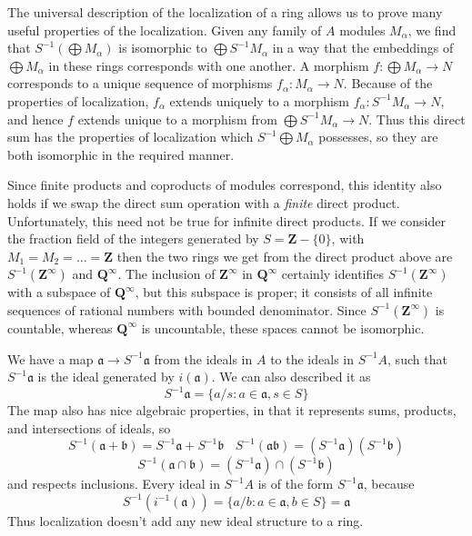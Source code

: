 The universal description of the localization of a ring allows us to prove many useful properties of the localization. Given any family of $A$ modules $M_\alpha$, we find that $S^{-1}(\bigoplus M_\alpha)$ is isomorphic to $\bigoplus S^{-1} M_\alpha$ in a way that the embeddings of $\bigoplus M_\alpha$ in these rings corresponds with one another. A morphism $f: \bigoplus M_\alpha \to N$ corresponds to a unique sequence of morphisms $f_\alpha: M_\alpha \to N$. Because of the properties of localization, $f_\alpha$ extends uniquely to a morphism $f_\alpha: S^{-1} M_\alpha \to N$, and hence $f$ extends unique to a morphism from $\bigoplus S^{-1} M_\alpha \to N$. Thus this direct sum has the properties of localization which $S^{-1} \bigoplus M_\alpha$ possesses, so they are both isomorphic in the required manner.

\begin{remark}
    Since finite products and coproducts of modules correspond, this identity also holds if we swap the direct sum operation with a {\it finite} direct product. Unfortunately, this need not be true for infinite direct products. If we consider the fraction field of the integers generated by $S = \mathbf{Z} - \{ 0 \}$, with $M_1 = M_2 = \dots = \mathbf{Z}$ then the two rings we get from the direct product above are $S^{-1}(\mathbf{Z}^\infty)$ and $\mathbf{Q}^\infty$. The inclusion of $\mathbf{Z}^\infty$ in $\mathbf{Q}^\infty$ certainly identifies $S^{-1}(\mathbf{Z}^\infty)$ with a subspace of $\mathbf{Q}^\infty$, but this subspace is proper; it consists of all infinite sequences of rational numbers with bounded denominator. Since $S^{-1}(\mathbf{Z}^\infty)$ is countable, whereas $\mathbf{Q}^\infty$ is uncountable, these spaces cannot be isomorphic.
\end{remark}

We have a map $\mathfrak{a} \to S^{-1}\mathfrak{a}$ from the ideals in $A$ to the ideals in $S^{-1}A$, such that $S^{-1}\mathfrak{a}$ is the ideal generated by $i(\mathfrak{a})$. We can also described it as
%
\[ S^{-1}\mathfrak{a} = \{ a/s : a \in \mathfrak{a}, s \in S \} \]
%
The map also has nice algebraic properties, in that it represents sums, products, and intersections of ideals, so
%
\[ S^{-1}(\mathfrak{a} + \mathfrak{b}) = S^{-1}\mathfrak{a} + S^{-1}\mathfrak{b}\ \ \ \ S^{-1}(\mathfrak{a} \mathfrak{b}) = (S^{-1} \mathfrak{a})(S^{-1}\mathfrak{b}) \]
\[ S^{-1}(\mathfrak{a} \cap \mathfrak{b}) = (S^{-1} \mathfrak{a}) \cap (S^{-1} \mathfrak{b}) \]
%
and respects inclusions. Every ideal in $S^{-1}A$ is of the form $S^{-1}\mathfrak{a}$, because
%
\[ S^{-1}(i^{-1}(\mathfrak{a})) = \{ a/b : a \in \mathfrak{a}, b \in S \} = \mathfrak{a} \]
%
Thus localization doesn't add any new ideal structure to a ring.

